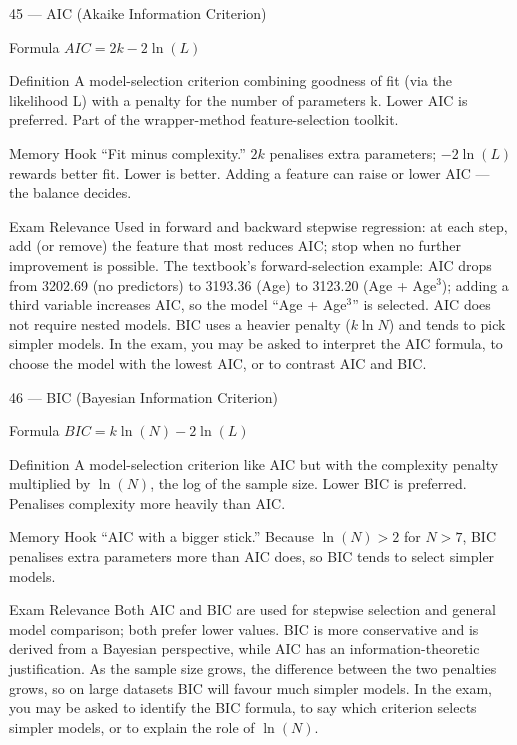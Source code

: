 \documentclass[aspectratio=169,8pt]{beamer}
\begin{document}
	\begin{frame}{45 --- AIC (Akaike Information Criterion)}
		\begin{block}{Formula}
			$AIC = 2k - 2\ln(L)$
		\end{block}
		\begin{block}{Definition}
			A model-selection criterion combining goodness of fit (via the likelihood L) with a penalty for the number of parameters k. Lower AIC is preferred. Part of the wrapper-method feature-selection toolkit.
		\end{block}
		\begin{block}{Memory Hook}
			``Fit minus complexity.'' $2k$ penalises extra parameters; $-2\ln(L)$ rewards better fit. Lower is better. Adding a feature can raise or lower AIC --- the balance decides.
		\end{block}
		\begin{block}{Exam Relevance}
			Used in forward and backward stepwise regression: at each step, add (or remove) the feature that most reduces AIC; stop when no further improvement is possible. The textbook's forward-selection example: AIC drops from 3202.69 (no predictors) to 3193.36 (Age) to 3123.20 (Age + Age$^3$); adding a third variable increases AIC, so the model ``Age + Age$^3$'' is selected. AIC does not require nested models. BIC uses a heavier penalty ($k\ln N$) and tends to pick simpler models. In the exam, you may be asked to interpret the AIC formula, to choose the model with the lowest AIC, or to contrast AIC and BIC.
		\end{block}
	\end{frame}
	
	\begin{frame}{46 --- BIC (Bayesian Information Criterion)}
		\begin{block}{Formula}
			$BIC = k\ln(N) - 2\ln(L)$
		\end{block}
		\begin{block}{Definition}
			A model-selection criterion like AIC but with the complexity penalty multiplied by $\ln(N)$, the log of the sample size. Lower BIC is preferred. Penalises complexity more heavily than AIC.
		\end{block}
		\begin{block}{Memory Hook}
			``AIC with a bigger stick.'' Because $\ln(N) > 2$ for $N > 7$, BIC penalises extra parameters more than AIC does, so BIC tends to select simpler models.
		\end{block}
		\begin{block}{Exam Relevance}
			Both AIC and BIC are used for stepwise selection and general model comparison; both prefer lower values. BIC is more conservative and is derived from a Bayesian perspective, while AIC has an information-theoretic justification. As the sample size grows, the difference between the two penalties grows, so on large datasets BIC will favour much simpler models. In the exam, you may be asked to identify the BIC formula, to say which criterion selects simpler models, or to explain the role of $\ln(N)$.
		\end{block}
	\end{frame}
	
\end{document}

